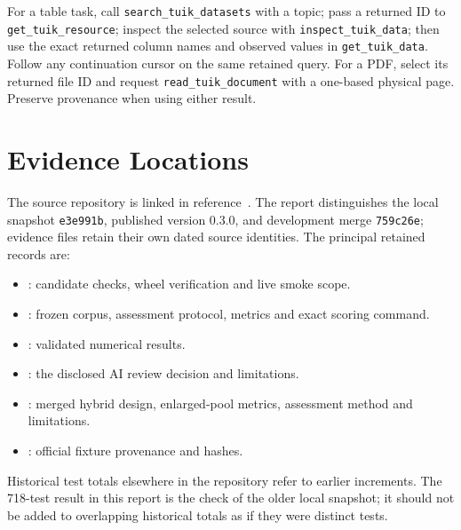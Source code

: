\documentclass[a4paper,12pt]{report}
\newcommand{\code}[1]{\texttt{\small #1}}
\newenvironment{singlespace}{\begingroup\renewcommand{\baselinestretch}{1}\selectfont}{\par\endgroup}
\begin{document}
For a table task, call \code{search\_tuik\_datasets} with a topic; pass a returned ID to \code{get\_tuik\_resource}; inspect the selected source with \code{inspect\_tuik\_data}; then use the exact returned column names and observed values in \code{get\_tuik\_data}. Follow any continuation cursor on the same retained query. For a PDF, select its returned file ID and request \code{read\_tuik\_document} with a one-based physical page. Preserve provenance when using either result.

\section{Evidence Locations}
The source repository is linked in reference~\cite{project}. The report distinguishes the local snapshot \code{e3e991b}, published version 0.3.0, and development merge \code{759c26e}; evidence files retain their own dated source identities. The principal retained records are:
\begin{singlespace}
\raggedright
\begin{itemize}
\item {}: candidate checks, wheel verification and live smoke scope.
\item {}: frozen corpus, assessment protocol, metrics and exact scoring command.
\item {}: validated numerical results.
\item {}: the disclosed AI review decision and limitations.
\item {}: merged hybrid design, enlarged-pool metrics, assessment method and limitations.
\item {}: official fixture provenance and hashes.
\end{itemize}
\end{singlespace}
Historical test totals elsewhere in the repository refer to earlier increments. The 718-test result in this report is the check of the older local snapshot; it should not be added to overlapping historical totals as if they were distinct tests.
\end{document}
